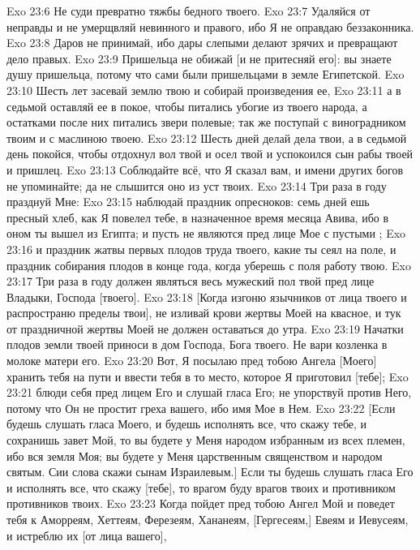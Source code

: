\rsbpar\vs Exo 23:6 Не суди превратно тяжбы бедного твоего.
\vs Exo 23:7 Удаляйся от неправды и не умерщвляй невинного и правого, ибо Я не оправдаю беззаконника.
\vs Exo 23:8 Даров не принимай, ибо дары слепыми делают зрячих и превращают дело правых.
\rsbpar\vs Exo 23:9 Пришельца не обижай [и не притесняй его]: вы знаете душу пришельца, потому что сами были пришельцами в земле Египетской.
\rsbpar\vs Exo 23:10 Шесть лет засевай землю твою и собирай произведения ее,
\vs Exo 23:11 а в седьмой оставляй ее в покое, чтобы питались убогие из твоего народа, а остатками после них питались звери полевые; так же поступай с виноградником твоим и с маслиною твоею.
\vs Exo 23:12 Шесть дней делай дела твои, а в седьмой день покойся, чтобы отдохнул вол твой и осел твой и успокоился сын рабы твоей и пришлец.
\rsbpar\vs Exo 23:13 Соблюдайте всё, что Я сказал вам, и имени других богов не упоминайте; да не слышится оно из уст твоих.
\rsbpar\vs Exo 23:14 Три раза в году празднуй Мне:
\vs Exo 23:15 наблюдай праздник опресноков: семь дней ешь пресный хлеб, как Я повелел тебе, в назначенное время месяца Авива, ибо в оном ты вышел из Египта; и пусть не являются пред лице Мое с пустыми ;
\vs Exo 23:16  и праздник жатвы первых плодов труда твоего, какие ты сеял на поле, и праздник собирания плодов в конце года, когда уберешь с поля работу твою.
\vs Exo 23:17 Три раза в году должен являться весь мужеский пол твой пред лице Владыки, Господа [твоего].
\rsbpar\vs Exo 23:18 [Когда изгоню язычников от лица твоего и распространю пределы твои], не изливай крови жертвы Моей на квасное, и тук от праздничной жертвы Моей не должен оставаться до утра.
\rsbpar\vs Exo 23:19 Начатки плодов земли твоей приноси в дом Господа, Бога твоего. Не вари козленка в молоке матери его.
\rsbpar\vs Exo 23:20 Вот, Я посылаю пред тобою Ангела [Моего] хранить тебя на пути и ввести тебя в то место, которое Я приготовил [тебе];
\vs Exo 23:21 блюди себя пред лицем Его и слушай гласа Его; не упорствуй против Него, потому что Он не простит греха вашего, ибо имя Мое в Нем.
\vs Exo 23:22 [Если будешь слушать гласа Моего, и будешь исполнять все, что скажу тебе, и сохранишь завет Мой, то вы будете у Меня народом избранным из всех племен, ибо вся земля Моя; вы будете у Меня царственным священством и народом святым. Сии слова скажи сынам Израилевым.] Если ты будешь слушать гласа Его и исполнять все, что скажу [тебе], то врагом буду врагов твоих и противником противников твоих.
\vs Exo 23:23 Когда пойдет пред тобою Ангел Мой и поведет тебя к Аморреям, Хеттеям, Ферезеям, Хананеям, [Гергесеям,] Евеям и Иевусеям, и истреблю их [от лица вашего],
